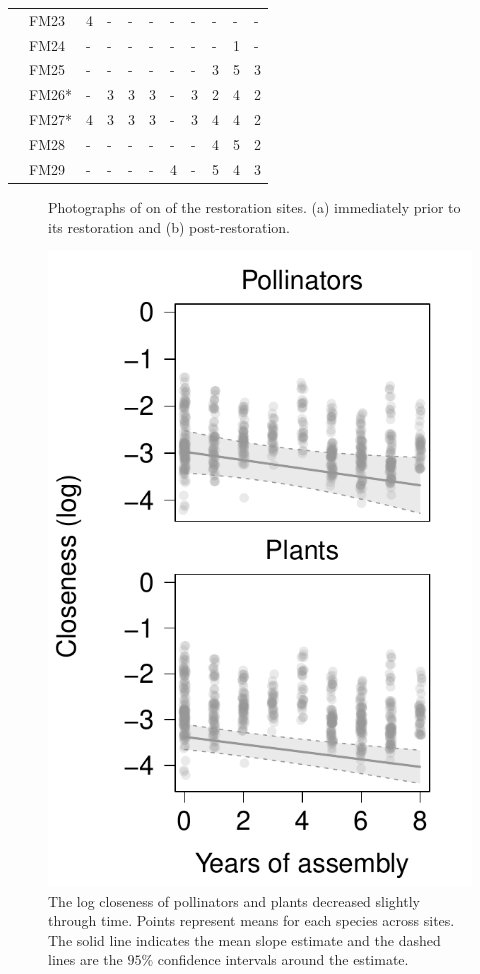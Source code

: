 \documentclass[12pt]{article}
\begin{document}
\begin{table}
\begin{tabular}{lllllllllll}
    &FM23 & 4 & - & - & - & - & - & - & - & -\\
    &FM24 & - & - & - & - & - & - & - & 1 & -\\
    &FM25 & - & - & - & - & - & - & 3 & 5 & 3\\
    &FM26* & - & 3 & 3 & 3 & - & 3 & 2 & 4 & 2\\
    &FM27* & 4 & 3 & 3 & 3 & - & 3 & 4 & 4 & 2\\
    &FM28 & - & - & - & - & - & - & 4 & 5 & 2\\
    &FM29 & - & - & - & - & 4 & - & 5 & 4 & 3\\
    \hline
  \end{tabular}
  \label{tab:controls}
\end{table}
\clearpage


\begin{figure}[!tbp]
  \centering
  \hfill
  \caption{Photographs of on of the restoration sites. (a) immediately prior to its restoration and (b) post-restoration.}
\end{figure}
\clearpage

\begin{figure}
  \centering
  \includegraphics[width=.6\textwidth]{../analysis/speciesLevel/figures/closenessPanel.pdf}
  \caption{The log closeness of pollinators and plants decreased
    slightly through time. Points represent means for each species
    across sites. The solid line indicates the mean slope estimate and
    the dashed lines are the $95\%$ confidence intervals around the
    estimate.}
  \label{fig:closeness}
\end{figure}
\clearpage
\end{document}
